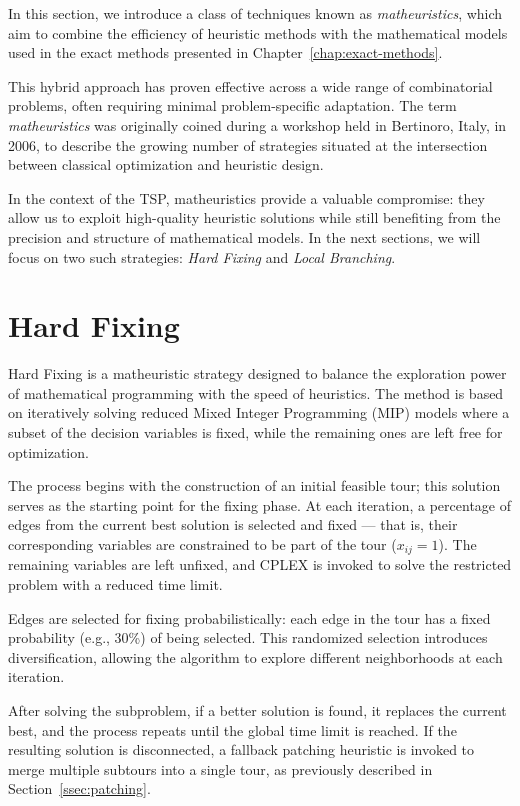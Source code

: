 \label{chap:matheuristics}
In this section, we introduce a class of techniques known as \emph{matheuristics}, which aim to combine the efficiency of heuristic methods with the mathematical models used in the exact methods presented in Chapter~\ref{chap:exact-methods}.

This hybrid approach has proven effective across a wide range of combinatorial problems, often requiring minimal problem-specific adaptation. The term \emph{matheuristics} was originally coined during a workshop held in Bertinoro, Italy, in 2006, to describe the growing number of strategies situated at the intersection between classical optimization and heuristic design.

In the context of the TSP, matheuristics provide a valuable compromise: they allow us to exploit high-quality heuristic solutions while still benefiting from the precision and structure of mathematical models. In the next sections, we will focus on two such strategies: \emph{Hard Fixing} and \emph{Local Branching}.

\section{Hard Fixing}

Hard Fixing is a matheuristic strategy designed to balance the exploration power of mathematical programming with the speed of heuristics. The method is based on iteratively solving reduced Mixed Integer Programming (MIP) models where a subset of the decision variables is fixed, while the remaining ones are left free for optimization.

The process begins with the construction of an initial feasible tour; this solution serves as the starting point for the fixing phase. At each iteration, a percentage of edges from the current best solution is selected and fixed — that is, their corresponding variables are constrained to be part of the tour (\( x_{ij} = 1 \)). The remaining variables are left unfixed, and CPLEX is invoked to solve the restricted problem with a reduced time limit.

Edges are selected for fixing probabilistically: each edge in the tour has a fixed probability (e.g., 30\%) of being selected. This randomized selection introduces diversification, allowing the algorithm to explore different neighborhoods at each iteration.

After solving the subproblem, if a better solution is found, it replaces the current best, and the process repeats until the global time limit is reached. If the resulting solution is disconnected, a fallback patching heuristic is invoked to merge multiple subtours into a single tour, as previously described in Section~\ref{ssec:patching}.

